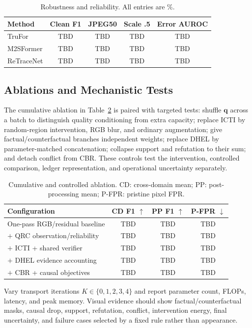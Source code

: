 \documentclass[journal]{IEEEtran}
\newcommand{\TBD}{\textcolor{red!70!black}{TBD}}
\newcommand{\method}{ReTraceNet}
\begin{document}
\begin{table}[t]
\centering
\caption{Robustness and reliability. All entries are \%.}
\label{tab:robust}
\begin{tabular}{lcccc}
\toprule
Method & Clean F1 & JPEG50 & Scale .5 & Error AUROC\\
\midrule
TruFor & \TBD & \TBD & \TBD & \TBD\\
M2SFormer & \TBD & \TBD & \TBD & \TBD\\
\method & \TBD & \TBD & \TBD & \TBD\\
\bottomrule
\end{tabular}
\end{table}

\subsection{Ablations and Mechanistic Tests}
The cumulative ablation in Table~\ref{tab:ablation} is paired with targeted tests:
shuffle $\mathbf q$ across a batch to distinguish quality conditioning from extra
capacity; replace ICTI by random-region intervention, RGB blur, and ordinary
augmentation; give factual/counterfactual branches independent weights; replace
DHEL by parameter-matched concatenation; collapse support and refutation to their
sum; and detach conflict from CBR. These controls test the intervention, controlled
comparison, ledger representation, and operational uncertainty separately.

\begin{table}[t]
\centering
\caption{Cumulative and controlled ablation. CD: cross-domain mean; PP:
post-processing mean; P-FPR: pristine pixel FPR.}
\label{tab:ablation}
\begin{tabular}{lccc}
\toprule
Configuration & CD F1 $\uparrow$ & PP F1 $\uparrow$ & P-FPR $\downarrow$\\
\midrule
One-pass RGB/residual baseline & \TBD & \TBD & \TBD\\
$+$ QRC observation/reliability & \TBD & \TBD & \TBD\\
$+$ ICTI + shared verifier & \TBD & \TBD & \TBD\\
$+$ DHEL evidence accounting & \TBD & \TBD & \TBD\\
$+$ CBR + causal objectives & \TBD & \TBD & \TBD\\
\bottomrule
\end{tabular}
\end{table}

Vary transport iterations $K\in\{0,1,2,3,4\}$ and report parameter count, FLOPs,
latency, and peak memory. Visual evidence should show factual/counterfactual masks,
causal drop, support, refutation, conflict, intervention energy, final uncertainty,
and failure cases selected by a fixed rule rather than appearance.
\end{document}
